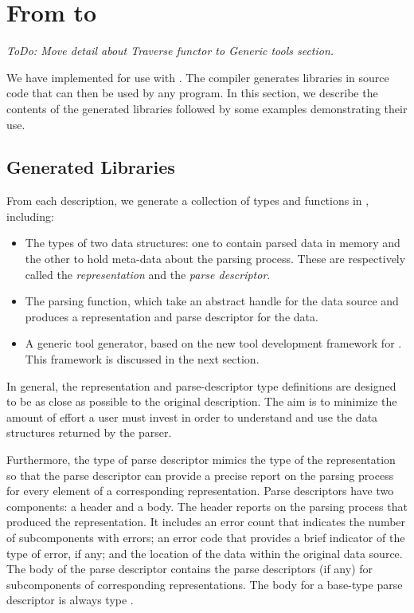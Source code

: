 
\section{From \padsmlbig{} to \ocamlbig{}}
\label{sec:padsml-impl}

{\em
ToDo: Move detail about Traverse functor to Generic tools section.
}

We have implemented \padsml{} for use with \ocaml{}. The \padsml{}
compiler generates libraries in \ocaml{} source code that can then be
used by any \ocaml{} program. In this section, we describe the
contents of the generated libraries followed by some examples
demonstrating their use.


\subsection{Generated Libraries}
\label{sec:gen-code}

From each \padsml{} description, we generate a collection of types and
functions in \ocaml{}, including:
\begin{itemize}
\item The types of two data structures: one to contain parsed data in
  memory and the other to hold meta-data about the parsing process.
  These are respectively called the \emph{representation} and
  the \emph{parse descriptor}.
\item The parsing function, which take an abstract handle for the data
  source and produces a representation and parse descriptor for the
  data.
\item A generic tool generator, based on the new tool development
  framework for \padsml{}. This framework is discussed in the next
  section.
\end{itemize} 

In general, the representation and parse-descriptor type definitions
are designed to be as close as possible to the original description.
The aim is to minimize the amount of effort a user must invest in
order to understand and use the data structures returned by the
parser.

Furthermore, the type of parse descriptor mimics the type of the
representation so that the parse descriptor can provide a precise
report on the parsing process for every element of a corresponding
representation. Parse descriptors have two components: a header and a
body. The header reports on the parsing process that produced the
representation. It includes an error count that indicates the number
of subcomponents with errors; an error code that provides a brief
indicator of the type of error, if any; and the location of the data
within the original data source. The body of the parse descriptor
contains the parse descriptors (if any) for subcomponents of
corresponding representations. The body for a base-type parse
descriptor is always type .

